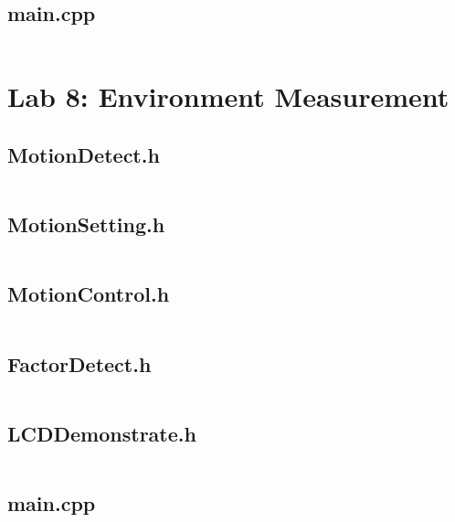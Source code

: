 \documentclass[../main]{subfiles}
\begin{document}
\subsection{main.cpp}
\inputminted{cpp}{src/7-obstacles/main.cpp}

\section{Lab 8: Environment Measurement}

\subsection{MotionDetect.h}
\inputminted{cpp}{src/8-environment/MotionDetect.h}

\subsection{MotionSetting.h}
\inputminted{cpp}{src/8-environment/MotionSetting.h}

\subsection{MotionControl.h}
\inputminted{cpp}{src/8-environment/MotionControl.h}

\subsection{FactorDetect.h}
\inputminted{cpp}{src/8-environment/FactorDetect.h}

\subsection{LCDDemonstrate.h}
\inputminted{cpp}{src/8-environment/LCDDemonstrate.h}

\subsection{main.cpp}
\inputminted{cpp}{src/8-environment/main.cpp}
\end{document}
